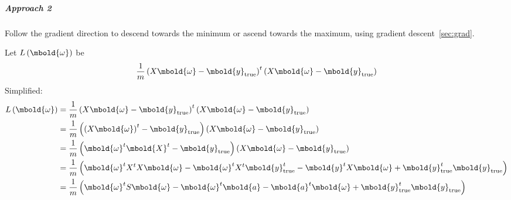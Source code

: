 \documentclass[12pt letter]{report}
\begin{document}
\subparagraph{Approach 2}

Follow the gradient direction to descend towards the minimum or ascend towards the maximum, using gradient
descent~\ref{sec:grad}.


Let $L \left( \mbold{\omega} \right) $ be
\[
  \frac{1}{m} \left( X \mbold{\omega} - \mbold{y}_{\text{true}} \right)^{t} \left( X \mbold{\omega} -
  \mbold{y}_{\text{true}} \right)
\]
Simplified:
\begin{align*}
  L \left( \mbold{\omega} \right) & =   \frac{1}{m} \left( X \mbold{\omega} - \mbold{y}_{\text{true}} \right)^{t} \left( X \mbold{\omega} -
  \mbold{y}_{\text{true}} \right)                                                                                                                          \\
                                  & = \frac{1}{m} \left( \left( X \mbold{\omega} \right)^{t}  - \mbold{y}_{\text{true}} \right)  \left( X \mbold{\omega} -
  \mbold{y}_{\text{true}} \right)                                                                                                                          \\
                                  & = \frac{1}{m} \left( \mbold{\omega}^{t} \mbold{X}^{t}   -
  \mbold{y}_{\text{true}} \right) \left( X\mbold{\omega} - \mbold{y}_{\text{true}} \right)                                                                 \\
                                  & = \frac{1}{m} \left( \mbold{\omega}^{t} X^t X \mbold{\omega} - \mbold{\omega}^t X^t
  \mbold{y}^t_{\text{true}} - \mbold{y}^t X \mbold{\omega} + \mbold{y}^t_{\text{true}}
  \mbold{y}_{\text{true}} \right)                                                                                                                          \\
                                  & = \frac{1}{m} \left( \mbold{\omega}^t S \mbold{\omega}- \mbold{\omega}^t \mbold{a} -
  \mbold{a}^t \mbold{\omega}
  + \mbold{y}^t_{\text{true}} \mbold{y}_{\text{true}} \right)                                                                                              \\
\end{align*}
\end{document}
